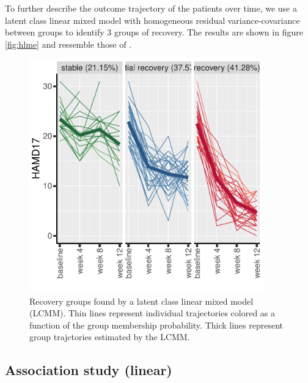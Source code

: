 \documentclass[12pt]{article}
\begin{document}
To further describe the outcome trajectory of the patients over time,
we use a latent class linear mixed model with homogeneous residual
variance-covariance between groups to identify 3 groups of
recovery. The results are shown in figure \autoref{fig:hlme} and
ressemble those of \cite{goerigk2021distinct}.

\begin{figure}[!h]
\centering
\includegraphics[trim={0 0 0 0},width=0.9\textwidth]{./figures/spaghetti-HAMD17.pdf}
\caption{\label{fig:hlme}Recovery groups found by a latent class linear mixed model (LCMM). Thin lines represent individual trajectories colored as a function of the group membership probability. Thick lines represent group trajctories estimated by the LCMM.}
\end{figure}



\subsection{Association study (linear)}
\label{sec:orga50caa6}
\end{document}
